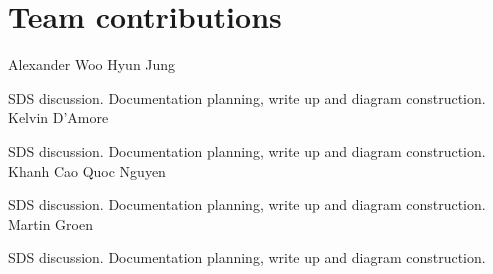\documentclass{article}
\begin{document}
\section{Team contributions}
Alexander Woo Hyun Jung 
 
SDS discussion. Documentation planning, write up and  diagram construction. \\

Kelvin D'Amore  

SDS discussion. Documentation planning, write up and  diagram construction. \\

Khanh Cao Quoc Nguyen  

SDS discussion. Documentation planning, write up and  diagram construction. \\

Martin Groen 

SDS discussion. Documentation planning, write up and  diagram construction. \\
\end{document}
